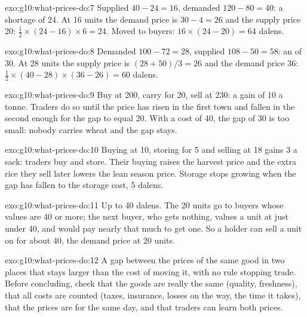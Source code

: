 \begin{solution}{exo:g10:what-prices-do:7}
Supplied $40 - 24 = 16$, demanded $120 - 80 = 40$: a shortage of 24. At 16 units the demand price is $30 - 4 = 26$ and the supply price 20:  $\tfrac12 \times (24 -
16) \times 6 = 24$. Moved to buyers: $16 \times (24 - 20) = 64$ dalens.
\end{solution}

\begin{solution}{exo:g10:what-prices-do:8}
Demanded $100 - 72 = 28$, supplied $108 - 50 = 58$: an  of 30. At 28 units the supply price is $(28 + 50)/3 = 26$ and the demand price 36: 
$\tfrac12 \times (40 - 28) \times (36 - 26) = 60$ dalens.
\end{solution}

\begin{solution}{exo:g10:what-prices-do:9}
Buy at 200, carry for 20, sell at 230: a gain of 10 a tonne. Traders do so until the price has risen in the first town and fallen in the second enough for the gap to equal
20. With a cost of 40, the gap of 30 is too small: nobody carries wheat and the gap stays.
\end{solution}

\begin{solution}{exo:g10:what-prices-do:10}
Buying at 10, storing for 5 and selling at 18 gains 3 a sack: traders buy and store. Their buying raises the harvest price and the extra rice they sell later lowers the lean
season price. Storage stops growing when the gap has fallen to the storage cost, 5 dalens.
\end{solution}

\begin{solution}{exo:g10:what-prices-do:11}
Up to 40 dalens. The 20 units go to buyers whose values are 40 or more; the next buyer, who gets nothing, values a unit at just under 40, and would pay nearly that much to get
one. So a holder can sell a unit on for about 40, the demand price at 20 units.
\end{solution}

\begin{solution}{exo:g10:what-prices-do:12}
A gap between the prices of the same good in two places that stays larger than the cost of moving it, with no rule stopping trade. Before concluding, check that the goods are
really the same (quality, freshness), that all costs are counted (taxes, insurance, losses on the way, the time it takes), that the prices are for the same day, and that traders
can learn both prices.
\end{solution}

